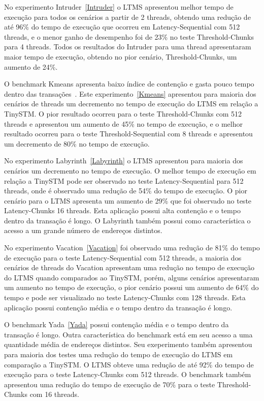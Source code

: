 \documentclass[diss,capa]{texufpel}
\begin{document}
No experimento Intruder~\ref{Intruder} o LTMS apresentou melhor tempo de execução para todos os cenários a partir de 2 threads, obtendo uma redução de até 96\% do tempo de execução que ocorreu em Latency-Sequential com 512 threads, e o menor ganho de desempenho foi de 23\% no teste Threshold-Chunks para 4 threads. Todos os resultados do Intruder para uma thread apresentaram maior tempo de execução, obtendo no pior cenário, Threshold-Chunks, um aumento de 24\%.

O benchmark Kmeans apresenta baixo índice de contenção e gasta pouco tempo dentro das transações~\cite{STAMP}. Este experimento~\ref{Kmeans} apresentou para maioria dos cenários de threads um decremento no tempo de execução do LTMS em relação a TinySTM. O pior resultado ocorreu para o teste Threshold-Chunks com 512 threads e apresentou um aumento de 45\% no tempo de execução, e o melhor resultado ocorreu para o teste Threshold-Sequential com 8 threads e apresentou um decremento de 80\% no tempo de execução.



No experimento Labyrinth~\ref{Labyrinth} o LTMS apresentou para maioria dos cenários um decremento no tempo de execução. O melhor tempo de execução em relação a TinySTM pode ser observado no teste Latency-Sequential para 512 threads, onde é observado uma redução de 54\% do tempo de execução. O pior cenário para o LTMS apresenta um aumento de 29\% que foi observado no teste Latency-Chunks 16 threads. Esta aplicação possui alta contenção e o tempo dentro da transação é longo. O Labyrinth também possui como característica o acesso a um grande número de endereços distintos.

No experimento Vacation~\ref{Vacation} foi observado uma redução de 81\% do tempo de execução para o teste Latency-Sequential com 512 threads, a maioria dos cenários de threads do Vacation apresentam uma redução no tempo de execução do LTMS quando comparados ao TinySTM, porém, alguns cenários apresentaram um aumento no tempo de execução, o pior cenário possui um aumento de 64\% do tempo e pode ser visualizado no teste Latency-Chunks com 128 threads. Esta aplicação possui contenção média e o tempo dentro da transação é longo.

O benchmark Yada~\ref{Yada} possui contenção média e o tempo dentro da transação é longo. Outra característica do benchmark está em seu acesso a uma quantidade média de endereços distintos. Seu exeperimento também apresentou para maioria dos testes uma redução do tempo de execução do LTMS em comparação a TinySTM. O LTMS obteve uma redução de até 92\% do tempo de execução para o teste Latency-Chunks com 512 threads. O benchmark também apresentou uma redução do tempo de execução de 70\% para o teste Threshold-Chunks com 16 threads.
\end{document}
